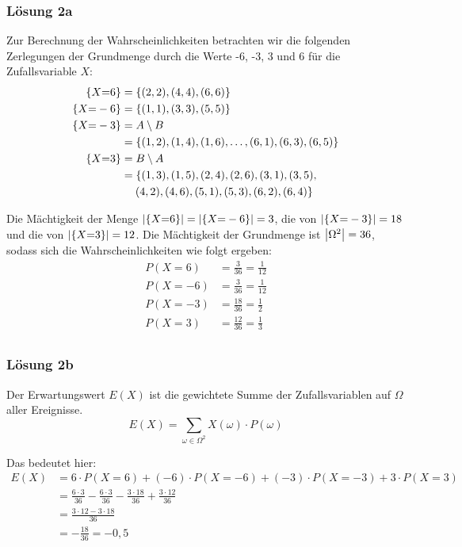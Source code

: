 \documentclass[main.tex]{subfiles}
\begin{document}
\subsubsection*{Lösung 2a}
Zur Berechnung der Wahrscheinlichkeiten betrachten wir die folgenden Zerlegungen der Grundmenge durch die Werte -6, -3, 3 und 6 für die Zufallsvariable $X$:
$$\begin{aligned}
    \set*{X {=} 6}  &= \set*{(2,2), (4,4), (6,6)} \\
    \set*{X {=} -6} &= \set*{(1,1), (3,3), (5,5)} \\
    \set*{X {=} -3} &= A\setminus B \\
                  &= \set*{
        (1,2), (1,4), (1,6), \dots, (6,1), (6,3), (6,5)
    } \\
    \set*{X {=} 3} &= B\setminus A\\
                 &= \left\{
                    (1,3), (1,5), (2,4), (2,6), (3,1), (3,5), \right.\\
                 &\quad \left. (4,2), (4,6), (5,1), (5,3), (6,2), (6,4) \right\}
\end{aligned}$$

Die Mächtigkeit der Menge $\abs*{\set*{X {=} 6}} = \abs*{\set*{X {=} -6}} = 3$, die von $\abs*{\set*{X {=} -3}} = 18$ und die von $\abs*{\set*{X {=} 3}} = 12$.
Die Mächtigkeit der Grundmenge ist $\abs*{\Omega^2} = 36$, sodass sich die Wahrscheinlichkeiten wie folgt ergeben:
$$\begin{aligned}
    P(X {=} 6)  &= \frac{3}{36} = \frac{1}{12} \\[2mm]
    P(X {=} -6) &= \frac{3}{36} = \frac{1}{12} \\[2mm]
    P(X {=} -3) &= \frac{18}{36} = \frac{1}{2} \\[2mm]
    P(X {=} 3)  &= \frac{12}{36} = \frac{1}{3} \\
\end{aligned}$$

\subsubsection*{Lösung 2b}
Der Erwartungswert $E(X)$ ist die gewichtete Summe der Zufallsvariablen auf $\Omega$ aller Ereignisse.
$$
    E(X) = \sum_{\omega\in\Omega^2} X(\omega) \cdot P(\omega)
$$

Das bedeutet hier:
$$\begin{aligned}
    E(X) &= 6\cdot P(X{=}6) + (-6)\cdot P(X{=}-6) + (-3)\cdot P(X{=}-3) + 3\cdot P(X{=}3) \\
    &= \frac{6\cdot 3}{36} - \frac{6\cdot 3}{36} - \frac{3\cdot 18}{36} + \frac{3\cdot 12}{36} \\[2mm]
    &= \frac{3\cdot 12 - 3\cdot 18}{36}\\[2mm]
    &= - \frac{18}{36} = -0,5
\end{aligned}$$
\end{document}

